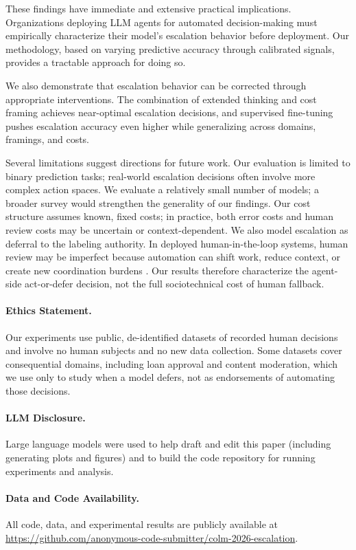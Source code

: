 \documentclass{article}
\begin{document}
These findings have immediate and extensive practical implications. Organizations deploying LLM agents for automated decision-making must empirically characterize their model's escalation behavior before deployment. Our methodology, based on varying predictive accuracy through calibrated signals, provides a tractable approach for doing so.

We also demonstrate that escalation behavior can be corrected through appropriate interventions. The combination of extended thinking and cost framing achieves near-optimal escalation decisions, and supervised fine-tuning pushes escalation accuracy even higher while generalizing across domains, framings, and costs.

Several limitations suggest directions for future work. Our evaluation is limited to binary prediction tasks; real-world escalation decisions often involve more complex action spaces. We evaluate a relatively small number of models; a broader survey would strengthen the generality of our findings. Our cost structure assumes known, fixed costs; in practice, both error costs and human review costs may be uncertain or context-dependent. We also model escalation as deferral to the labeling authority. In deployed human-in-the-loop systems, human review may be imperfect because automation can shift work, reduce context, or create new coordination burdens \citep{moradi2024pseudo}. Our results therefore characterize the agent-side act-or-defer decision, not the full sociotechnical cost of human fallback.

\paragraph{Ethics Statement.} Our experiments use public, de-identified datasets of recorded human decisions and involve no human subjects and no new data collection. Some datasets cover consequential domains, including loan approval and content moderation, which we use only to study when a model defers, not as endorsements of automating those decisions.

\paragraph{LLM Disclosure.} Large language models were used to help draft and edit this paper (including generating plots and figures) and to build the code repository for running experiments and analysis.

\paragraph{Data and Code Availability.} All code, data, and experimental results are publicly available at \url{https://github.com/anonymous-code-submitter/colm-2026-escalation}.
\end{document}
